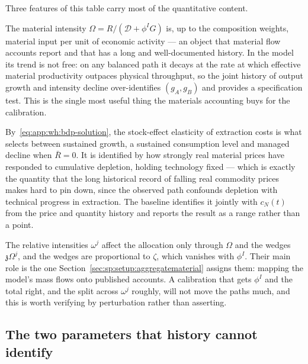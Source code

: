 Three features of this table carry most of the quantitative content.

 The material intensity $\Omega=R/\left(\mathcal D+\phi^IG\right)$ is, up to the composition weights, material input per unit of economic activity --- an object that material flow accounts report and that has a long and well-documented history. In the model its trend is not free: on any balanced path it decays at the rate at which effective material productivity outpaces physical throughput, so the joint history of output growth and intensity decline over-identifies $\left(g_A,g_B\right)$ and provides a specification test. This is the single most useful thing the materials accounting buys for the calibration.

 By~\eqref{eq:app:wh:bdp-solution}, the stock-effect elasticity of extraction costs is what selects between sustained growth, a sustained consumption level and managed decline when $\bar R=0$. It is identified by how strongly real material prices have responded to cumulative depletion, holding technology fixed --- which is exactly the quantity that the long historical record of falling real commodity prices makes hard to pin down, since the observed path confounds depletion with technical progress in extraction. The baseline identifies it jointly with $c_N(t)$ from the price and quantity history and reports the result as a range rather than a point.

 The relative intensities $\omega^j$ affect the allocation only through $\Omega$ and the wedges $\mathfrak z\Omega^j$, and the wedges are proportional to $\zeta$, which vanishes with $\phi^I$. Their main role is the one Section~\ref{sec:sp:setup:aggregatematerial} assigns them: mapping the model's mass flows onto published accounts. A calibration that gets $\phi^I$ and the total right, and the split across $\omega^j$ roughly, will not move the paths much, and this is worth verifying by perturbation rather than asserting.

\subsection{The two parameters that history cannot identify}\label{sec:q:cal:hard}

